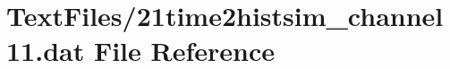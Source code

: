 \hypertarget{21time2histsim__channel11_8dat}{}\section{Text\+Files/21time2histsim\+\_\+channel11.dat File Reference}
\label{21time2histsim__channel11_8dat}
